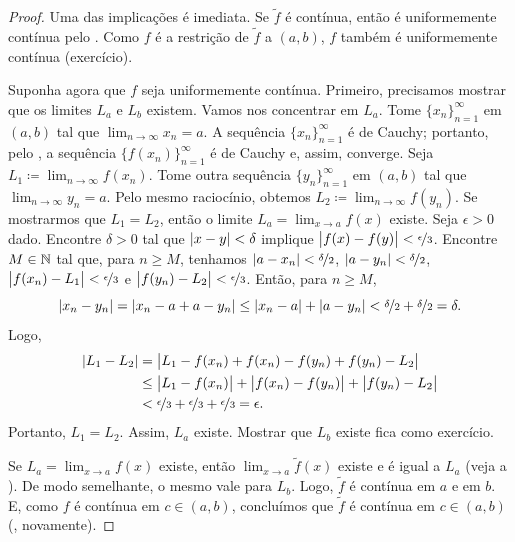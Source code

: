 \begin{proof}
Uma das implicações é imediata. Se $\widetilde{f}$ é contínua,
então é uniformemente contínua pelo . Como $f$ é a
restrição de $\widetilde{f}$ a $(a,b)$, $f$ também é uniformemente contínua
(exercício).

Suponha agora que $f$ seja uniformemente contínua. Primeiro, precisamos mostrar
que os limites $L_a$ e $L_b$ existem. Vamos nos concentrar em $L_a$.
Tome $\{ x_n \}_{n=1}^\infty$ em $(a,b)$ tal que
$\lim_{n\to\infty} x_n = a$.
A sequência $\{ x_n \}_{n=1}^\infty$ é de Cauchy; portanto, pelo
,
a sequência $\bigl\{ f(x_n) \bigr\}_{n=1}^\infty$ é de Cauchy e, assim, converge.
Seja $L_1 \coloneqq \lim_{n\to\infty} f(x_n)$. Tome outra sequência
$\{ y_n \}_{n=1}^\infty$ em $(a,b)$ tal que $\lim_{n\to\infty} y_n = a$.
Pelo mesmo raciocínio, obtemos
$L_2 \coloneqq \lim_{n\to\infty} f(y_n)$. Se mostrarmos que $L_1 = L_2$,
então o limite $L_a = \lim_{x\to a} f(x)$ existe. Seja $\epsilon > 0$ dado.
Encontre $\delta > 0$ tal que $\lvert {x-y} \rvert < \delta$ implique
$\bigl\lvert {f(x)-f(y)} \bigr\rvert < \nicefrac{\epsilon}{3}$. Encontre $M \in {\mathbb{N}}$ tal que, para
$n \geq M$, tenhamos $\lvert {a-x_n} \rvert < \nicefrac{\delta}{2}$,
$\lvert {a-y_n} \rvert < \nicefrac{\delta}{2}$,
$\bigl\lvert {f(x_n)-L_1} \bigr\rvert < \nicefrac{\epsilon}{3}$ e
$\bigl\lvert {f(y_n)-L_2} \bigr\rvert < \nicefrac{\epsilon}{3}$. Então, para $n \geq M$,
\begin{equation*}
\lvert {x_n-y_n} \rvert =
\lvert {x_n-a+a-y_n} \rvert \leq
\lvert {x_n-a} \rvert+\lvert {a-y_n} \rvert < \nicefrac{\delta}{2} + \nicefrac{\delta}{2} =
\delta.
\end{equation*}
Logo,
\begin{equation*}
\begin{split}
\lvert {L_1-L_2} \rvert &=
\bigl\lvert {L_1-f(x_n)+f(x_n)-f(y_n)+f(y_n)-L_2} \bigr\rvert \\
& \leq
\bigl\lvert {L_1-f(x_n)} \bigr\rvert+\bigl\lvert {f(x_n)-f(y_n)} \bigr\rvert+\bigl\lvert {f(y_n)-L_2} \bigr\rvert \\
& <
\nicefrac{\epsilon}{3} + \nicefrac{\epsilon}{3} + \nicefrac{\epsilon}{3}
=
\epsilon .
\end{split}
\end{equation*}
Portanto, $L_1 = L_2$.
Assim, $L_a$ existe. Mostrar que $L_b$ existe fica como exercício.

Se $L_a = \lim_{x\to a} f(x)$ existe, então $\lim_{x\to a} \widetilde{f}(x)$
existe e é igual a $L_a$ (veja a ).
De modo semelhante, o mesmo vale para $L_b$.
Logo, $\widetilde{f}$ é contínua em $a$ e em $b$.
E, como $f$ é contínua em $c \in (a,b)$,
concluímos que $\widetilde{f}$ é contínua em $c \in (a,b)$
(, novamente).
\end{proof}

